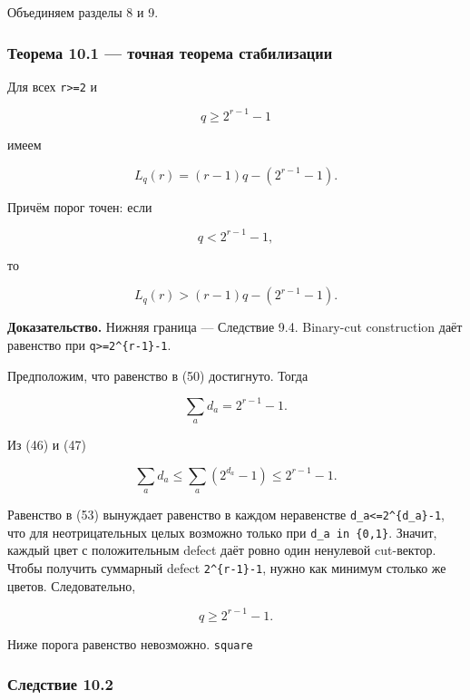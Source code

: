 Объединяем разделы 8 и 9.

\hypertarget{ux442ux435ux43eux440ux435ux43cux430-10.1-ux442ux43eux447ux43dux430ux44f-ux442ux435ux43eux440ux435ux43cux430-ux441ux442ux430ux431ux438ux43bux438ux437ux430ux446ux438ux438}{%
\subsubsection{Теорема 10.1 --- точная теорема
стабилизации}\label{ux442ux435ux43eux440ux435ux43cux430-10.1-ux442ux43eux447ux43dux430ux44f-ux442ux435ux43eux440ux435ux43cux430-ux441ux442ux430ux431ux438ux43bux438ux437ux430ux446ux438ux438}}

Для всех \texttt{r\textgreater{}=2} и

\[
q\ge2^{r-1}-1
\]

имеем

\[
\boxed{
L_q(r)=(r-1)q-(2^{r-1}-1).
}
\tag{51}
\]

Причём порог точен: если

\[
q<2^{r-1}-1,
\]

то

\[
L_q(r)>(r-1)q-(2^{r-1}-1).
\tag{52}
\]

\textbf{Доказательство.} Нижняя граница --- Следствие 9.4. Binary-cut
construction даёт равенство при \texttt{q\textgreater{}=2\^{}\{r-1\}-1}.

Предположим, что равенство в (50) достигнуто. Тогда

\[
\sum_a d_a=2^{r-1}-1.
\tag{53}
\]

Из (46) и (47)

\[
\sum_a d_a
\le
\sum_a(2^{d_a}-1)
\le
2^{r-1}-1.
\tag{54}
\]

Равенство в (53) вынуждает равенство в каждом неравенстве
\texttt{d\_a\textless{}=2\^{}\{d\_a\}-1}, что для неотрицательных целых
возможно только при \texttt{d\_a\ in\ \{0,1\}}. Значит, каждый цвет с
положительным defect даёт ровно один ненулевой cut-вектор. Чтобы
получить суммарный defect \texttt{2\^{}\{r-1\}-1}, нужно как минимум
столько же цветов. Следовательно,

\[
q\ge2^{r-1}-1.
\]

Ниже порога равенство невозможно. \texttt{square}

\hypertarget{ux441ux43bux435ux434ux441ux442ux432ux438ux435-10.2}{%
\subsubsection{Следствие
10.2}\label{ux441ux43bux435ux434ux441ux442ux432ux438ux435-10.2}}

